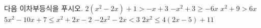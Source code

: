 다음 이차부등식을 푸시오.
 $2(x^2-2x)+1>-x+3$
 $-x^2+3\ge -6x$
 $x^2+9>6x$
 $5x^2-10x+7\le x^2+2x-2$
 $-2x^2-2x<3$
 $2x^2\le 4(2x-5)+11$
